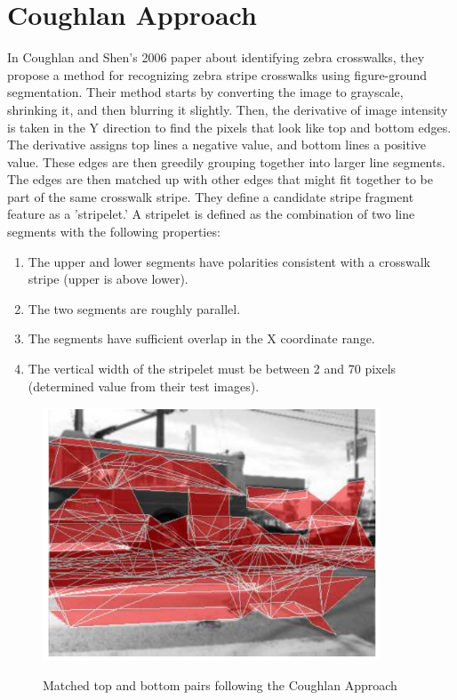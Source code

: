 \documentclass[12pt]{ucthesis}
\newcommand{\captionfonts}{\small\bf\ssp}
\begin{document}
\section{Coughlan Approach}
In Coughlan and Shen's 2006 paper \cite{Coughlan2006} about identifying zebra crosswalks, they propose a method for recognizing zebra stripe crosswalks using figure-ground segmentation.  Their method starts by converting the image to grayscale, shrinking it, and then blurring it slightly. Then, the derivative of image intensity is taken in the Y direction to find the pixels that look like top and bottom edges. The derivative assigns top lines a negative value, and bottom lines a positive value.  These edges are then greedily grouping together into larger line segments. The edges are then matched up with other edges that might fit together to be part of the same crosswalk stripe. They define a candidate stripe fragment feature as a 'stripelet.' A stripelet is defined as the combination of two line segments with the following properties: 
\begin{enumerate}
  \item The upper and lower segments have polarities consistent with a crosswalk stripe (upper is above lower).
  \item The two segments are roughly parallel.
  \item The segments have sufficient overlap in the X coordinate range.
  \item The vertical width of the stripelet must be between 2 and 70 pixels (determined value from their test images).
\end{enumerate}

\begin{figure}[t]
\begin{center}
\includegraphics[width=10cm]{CoughlanStriplets.png}
\captionfonts
\caption[Coughlan Approach Stripelets]{Matched top and bottom pairs following the Coughlan Approach \cite{Coughlan2006}}
\label{fig:CoughlanStriplets}
\end{center}
\end{figure}
\end{document}
